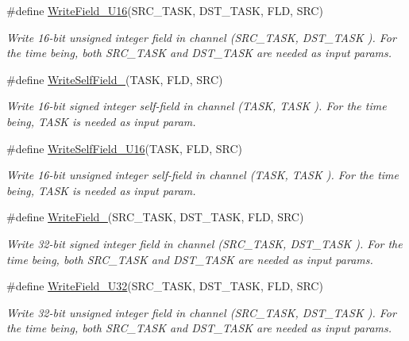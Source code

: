 \begin{DoxyCompactItemize}
\#define \hyperlink{group__interpow__read__write_ga58f71a953a06a6e8f69f9244c151dfc5}{Write\+Field\+\_\+\+U16}(S\+R\+C\+\_\+\+T\+A\+SK,  D\+S\+T\+\_\+\+T\+A\+SK,  F\+LD,  S\+RC)
\begin{DoxyCompactList}\small\item\em Write 16-\/bit unsigned integer field in channel ({\itshape S\+R\+C\+\_\+\+T\+A\+SK}, {\itshape D\+S\+T\+\_\+\+T\+A\+SK} ). For the time being, both S\+R\+C\+\_\+\+T\+A\+SK and D\+S\+T\+\_\+\+T\+A\+SK are needed as input params. \end{DoxyCompactList}\item 
\#define \hyperlink{group__interpow__read__write_ga5b49e015f652cdccc9755666ed7603b7}{Write\+Self\+Field\+\_}(T\+A\+SK,  F\+LD,  S\+RC)
\begin{DoxyCompactList}\small\item\em Write 16-\/bit signed integer self-\/field in channel ({\itshape T\+A\+SK}, {\itshape T\+A\+SK} ). For the time being, T\+A\+SK is needed as input param. \end{DoxyCompactList}\item 
\#define \hyperlink{group__interpow__read__write_ga397af44c51f5c0b43aa48a429d64972f}{Write\+Self\+Field\+\_\+\+U16}(T\+A\+SK,  F\+LD,  S\+RC)
\begin{DoxyCompactList}\small\item\em Write 16-\/bit unsigned integer self-\/field in channel ({\itshape T\+A\+SK}, {\itshape T\+A\+SK} ). For the time being, T\+A\+SK is needed as input param. \end{DoxyCompactList}\item 
\#define \hyperlink{group__interpow__read__write_ga374eba133dbdcd78229749be95aafcfd}{Write\+Field\+\_}(S\+R\+C\+\_\+\+T\+A\+SK,  D\+S\+T\+\_\+\+T\+A\+SK,  F\+LD,  S\+RC)
\begin{DoxyCompactList}\small\item\em Write 32-\/bit signed integer field in channel ({\itshape S\+R\+C\+\_\+\+T\+A\+SK}, {\itshape D\+S\+T\+\_\+\+T\+A\+SK} ). For the time being, both S\+R\+C\+\_\+\+T\+A\+SK and D\+S\+T\+\_\+\+T\+A\+SK are needed as input params. \end{DoxyCompactList}\item 
\#define \hyperlink{group__interpow__read__write_gac1587788948a550d7b99c20473bf3906}{Write\+Field\+\_\+\+U32}(S\+R\+C\+\_\+\+T\+A\+SK,  D\+S\+T\+\_\+\+T\+A\+SK,  F\+LD,  S\+RC)
\begin{DoxyCompactList}\small\item\em Write 32-\/bit unsigned integer field in channel ({\itshape S\+R\+C\+\_\+\+T\+A\+SK}, {\itshape D\+S\+T\+\_\+\+T\+A\+SK} ). For the time being, both S\+R\+C\+\_\+\+T\+A\+SK and D\+S\+T\+\_\+\+T\+A\+SK are needed as input params. \end{DoxyCompactList}\item 

\end{DoxyCompactItemize}
